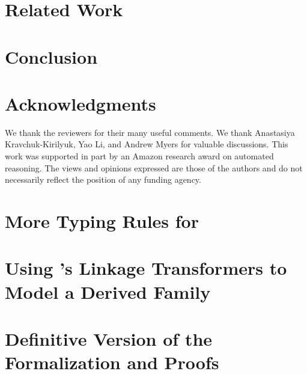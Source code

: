 \section{Related Work}\label{sec:related-work}


\section{Conclusion}
\label{sec:conclusion}



\ifacknowledgments
\section*{Acknowledgments}
We thank the reviewers for their many useful comments.  We thank
Anastasiya Kravchuk-Kirilyuk, Yao Li, and Andrew Myers %
for valuable discussions.
This work was supported in part by an Amazon research award on automated
reasoning.
The views and opinions expressed are those of the authors and do not necessarily
reflect the position of any funding agency.
\fi

\setlength{\bibsep}{.8ex}



\ifreport

\appendix

\newpage

\section{More Typing Rules for \TT}
\label{sec:more-rules}


\newpage

\section{Using \TT's Linkage Transformers to Model a Derived Family}
\label{sec:lt-in-action}


\newpage

\section{Definitive Version of the Formalization and Proofs}
\label{sec:agda-files}


%
%
%

\fi